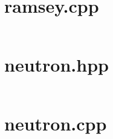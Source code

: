 \section{ramsey.cpp}

\inputminted{cpp}{code_snippets/ramsey.cpp}

\section{neutron.hpp}

\inputminted{cpp}{code_snippets/neutron.hpp}

\section{neutron.cpp}

\inputminted{cpp}{code_snippets/neutron.cpp}